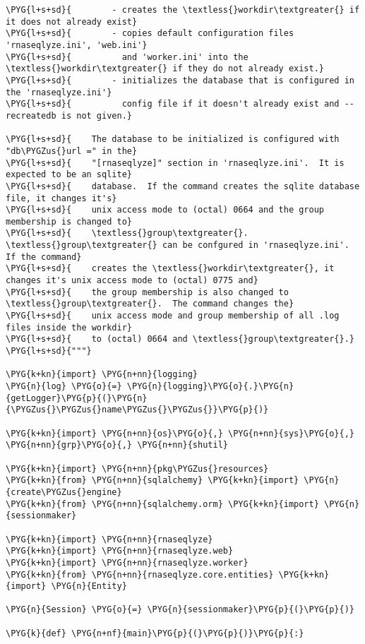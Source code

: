\begin{Verbatim}[commandchars=\\\{\}]
\PYG{l+s+sd}{        - creates the \textless{}workdir\textgreater{} if it does not already exist}
\PYG{l+s+sd}{        - copies default configuration files 'rnaseqlyze.ini', 'web.ini'}
\PYG{l+s+sd}{          and 'worker.ini' into the \textless{}workdir\textgreater{} if they do not already exist.}
\PYG{l+s+sd}{        - initializes the database that is configured in the 'rnaseqlyze.ini'}
\PYG{l+s+sd}{          config file if it doesn't already exist and --recreatedb is not given.}

\PYG{l+s+sd}{    The database to be initialized is configured with "db\PYGZus{}url =" in the}
\PYG{l+s+sd}{    "[rnaseqlyze]" section in 'rnaseqlyze.ini'.  It is expected to be an sqlite}
\PYG{l+s+sd}{    database.  If the command creates the sqlite database file, it changes it's}
\PYG{l+s+sd}{    unix access mode to (octal) 0664 and the group membership is changed to}
\PYG{l+s+sd}{    \textless{}group\textgreater{}.  \textless{}group\textgreater{} can be confgured in 'rnaseqlyze.ini'.  If the command}
\PYG{l+s+sd}{    creates the \textless{}workdir\textgreater{}, it changes it's unix access mode to (octal) 0775 and}
\PYG{l+s+sd}{    the group membership is also changed to \textless{}group\textgreater{}.  The command changes the}
\PYG{l+s+sd}{    unix access mode and group membership of all .log files inside the workdir}
\PYG{l+s+sd}{    to (octal) 0664 and \textless{}group\textgreater{}.}
\PYG{l+s+sd}{"""}

\PYG{k+kn}{import} \PYG{n+nn}{logging}
\PYG{n}{log} \PYG{o}{=} \PYG{n}{logging}\PYG{o}{.}\PYG{n}{getLogger}\PYG{p}{(}\PYG{n}{\PYGZus{}\PYGZus{}name\PYGZus{}\PYGZus{}}\PYG{p}{)}

\PYG{k+kn}{import} \PYG{n+nn}{os}\PYG{o}{,} \PYG{n+nn}{sys}\PYG{o}{,} \PYG{n+nn}{grp}\PYG{o}{,} \PYG{n+nn}{shutil}

\PYG{k+kn}{import} \PYG{n+nn}{pkg\PYGZus{}resources}
\PYG{k+kn}{from} \PYG{n+nn}{sqlalchemy} \PYG{k+kn}{import} \PYG{n}{create\PYGZus{}engine}
\PYG{k+kn}{from} \PYG{n+nn}{sqlalchemy.orm} \PYG{k+kn}{import} \PYG{n}{sessionmaker}

\PYG{k+kn}{import} \PYG{n+nn}{rnaseqlyze}
\PYG{k+kn}{import} \PYG{n+nn}{rnaseqlyze.web}
\PYG{k+kn}{import} \PYG{n+nn}{rnaseqlyze.worker}
\PYG{k+kn}{from} \PYG{n+nn}{rnaseqlyze.core.entities} \PYG{k+kn}{import} \PYG{n}{Entity}

\PYG{n}{Session} \PYG{o}{=} \PYG{n}{sessionmaker}\PYG{p}{(}\PYG{p}{)}

\PYG{k}{def} \PYG{n+nf}{main}\PYG{p}{(}\PYG{p}{)}\PYG{p}{:}


\end{Verbatim}
